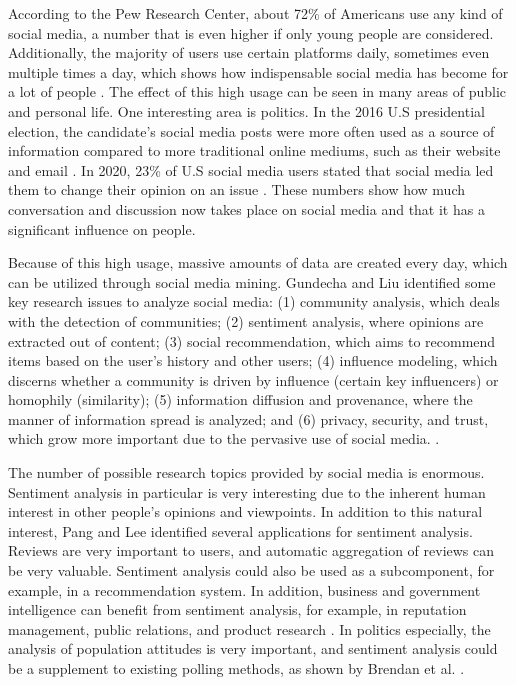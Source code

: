 According to the Pew Research Center, about 72\% of Americans use any kind of social media, a number that is even higher if only young people are considered. Additionally, the majority of users use certain platforms daily, sometimes even multiple times a day, which shows how indispensable social media has become for a lot of people \cite{pew:socialmedia}. The effect of this high usage can be seen in many areas of public and personal life. One interesting area is politics. In the 2016 U.S presidential election, the candidate's social media posts were more often used as a source of information compared to more traditional online mediums, such as their website and email \cite{pew:2016source}. In 2020, 23\% of U.S social media users stated that social media led them to change their opinion on an issue \cite{pew:2020influence}. These numbers show how much conversation and discussion now takes place on social media and that it has a significant influence on people.

Because of this high usage, massive amounts of data are created every day, which can be utilized through social media mining. Gundecha and Liu identified some key research issues to analyze social media: (1) community analysis, which deals with the detection of communities; (2) sentiment analysis, where opinions are extracted out of content; (3) social recommendation, which aims to recommend items based on the user's history and other users; (4) influence modeling, which discerns whether a community is driven by influence (certain key influencers) or homophily (similarity); (5) information diffusion and provenance, where the manner of information spread is analyzed; and (6) privacy, security, and trust, which grow more important due to the pervasive use of social media. \cite{Gundecha2012MiningSM}.

The number of possible research topics provided by social media is enormous. Sentiment analysis in particular is very interesting due to the inherent human interest in other people's opinions and viewpoints. In addition to this natural interest, Pang and Lee identified several applications for sentiment analysis. Reviews are very important to users, and automatic aggregation of reviews can be very valuable. Sentiment analysis could also be used as a subcomponent, for example, in a recommendation system. In addition, business and government intelligence can benefit from sentiment analysis, for example, in reputation management, public relations, and product research \cite{pang-etal-2002-thumbs}. In politics especially, the analysis of population attitudes is very important, and sentiment analysis could be a supplement to existing polling methods, as shown by Brendan et al. \cite{polls}. 

